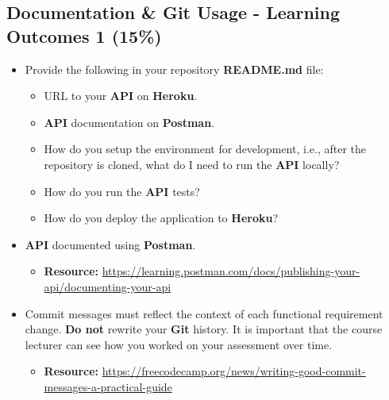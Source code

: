 \documentclass{article}
\begin{document}
\subsection*{Documentation \& Git Usage - Learning Outcomes 1 (15\%)}
\begin{itemize}
	\item Provide the following in your repository \textbf{README.md} file:
	      \begin{itemize}
		      \item URL to your \textbf{API} on \textbf{Heroku}.
		      \item \textbf{API} documentation on \textbf{Postman}.
		      \item How do you setup the environment for development, i.e., after the repository is cloned, what do I need to run the \textbf{API} locally?
					\item How do you run the \textbf{API} tests?
					\item How do you deploy the application to \textbf{Heroku}?
	      \end{itemize}
			\end{itemize}
			\begin{itemize}
	\item \textbf{API} documented using \textbf{Postman}.
	\begin{itemize}
		\item \textbf{Resource:} \footnotesize\href{https://learning.postman.com/docs/publishing-your-api/documenting-your-api}{https://learning.postman.com/docs/publishing-your-api/documenting-your-api}
	\end{itemize}
	\item Commit messages must reflect the context of each functional requirement change. \textbf{Do not} rewrite your \textbf{Git} history. It is important that the course lecturer can see how you worked on your assessment over time.
	      \begin{itemize}
		      \item \textbf{Resource:} \footnotesize\href{https://freecodecamp.org/news/writing-good-commit-messages-a-practical-guide}{https://freecodecamp.org/news/writing-good-commit-messages-a-practical-guide}
	      \end{itemize}
\end{itemize}
\end{document}
